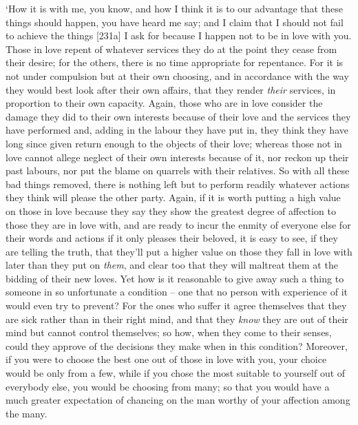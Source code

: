 ‘How it is with me, you know, and how I think it is to our advantage
that these things should
happen, you have heard me say; and I claim that I should not fail to
achieve the things {[}231a{]} I ask for because I happen not to be in
love with you. Those in love repent of whatever services they do at the
point they cease from their desire; for the others, there is no time
appropriate for repentance. For it is not under compulsion but at their
own  choosing, and in accordance with the way they would best
look after their own affairs, that they render {\em their} services, in
proportion to their own
capacity. Again, those
who are in love consider the damage they did to their own interests
because of their love and the services they have performed and, adding
in the labour they have put in, they think they have long since 
given return enough to the objects of their love; whereas those not in
love cannot allege neglect of their own interests because of it, nor
reckon up their past labours, nor put the blame on quarrels with their
relatives. So with all these bad things  removed, there is
nothing left but to perform readily whatever actions they think will
please the other party.
Again, if it is  worth putting a high value on those in love
because they say they show the greatest degree of affection to those
they are in love with, and are ready to incur the enmity of everyone
else for their words and
actions if it only pleases their beloved, it  is easy to see, if
they are telling the truth, that they'll put a higher value on those
they fall in love with later than they put on {\em them}, and clear too
that they will maltreat them at the bidding of their new loves. Yet how
is it reasonable to give  away such a
thing to someone in so
unfortunate a condition -- one that no person with experience of it
would even try to prevent? For the ones who suffer it agree themselves
that they are sick rather than in their right mind, and that they
{\em know} they are out of their mind but cannot control themselves; so
 how, when they come to their senses, could they approve of the
decisions they make when in this condition? Moreover, if you were to
choose the best one out of those in love with you, your choice would be
only from a few, while if you chose the most suitable to yourself out of
everybody else, you would be choosing  from many; so that you
would have a much greater expectation of chancing on the man worthy of
your affection among the
many.

